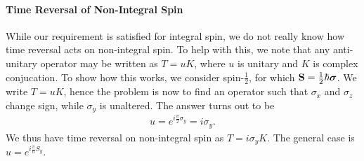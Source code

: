 \paragraph{Time Reversal of Non-Integral Spin}
While our requirement is satisfied for integral spin, we do not really know how time reversal acts on non-integral spin. To help with this, we note that any anti-unitary operator may be written as $T = uK$, where $u$ is unitary and $K$ is complex conjucation. To show how this works, we consider spin-$\frac{1}{2}$, for which $\vb{S} = \frac{1}{2}\hbar\vb*{\sigma}$. We write $T = uK$, hence the problem is now to find an operator such that $\sigma_{x}$ and $\sigma_{z}$ change sign, while $\sigma_{y}$ is unaltered. The answer turns out to be
\begin{align*}
	u = e^{i\frac{\pi}{2}\sigma_{y}} = i\sigma_{y}.
\end{align*}
We thus have time reversal on non-integral spin as $T = i\sigma_{y}K$. The general case is $u = e^{i\frac{\pi}{\hbar}S_{y}}$.